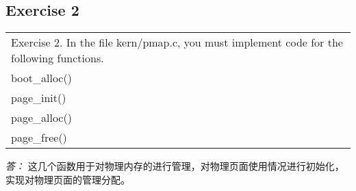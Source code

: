 \documentclass[11pt,a4paper]{article}
\begin{document}
\subsection{Exercise 2}
\begin{tabular}{|p{\textwidth}|}
\hline
Exercise 2.  In the file kern/pmap.c, you must implement code for the following functions.\\
\hspace{2em}boot\_alloc()\\
\hspace{2em}page\_init()\\
\hspace{2em}page\_alloc()\\
\hspace{2em}page\_free()\\
\hline
\end{tabular}
\textit{\large{答：}}
这几个函数用于对物理内存的进行管理，对物理页面使用情况进行初始化，实现对物理页面的管理分配。
\end{document}
